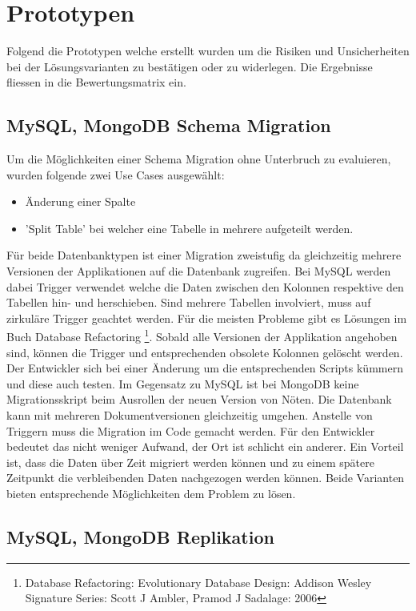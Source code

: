 \section{Prototypen}

Folgend die Prototypen welche erstellt wurden um die Risiken und Unsicherheiten bei der Lösungsvarianten zu bestätigen oder zu widerlegen. Die Ergebnisse fliessen in die Bewertungsmatrix ein.

\subsection{MySQL, MongoDB Schema Migration}

Um die Möglichkeiten einer Schema Migration ohne Unterbruch zu evaluieren, wurden folgende zwei Use Cases ausgewählt:
\begin{itemize}
	\item Änderung einer Spalte
	\item 'Split Table' bei welcher eine Tabelle in mehrere aufgeteilt werden.
\end{itemize}
Für beide Datenbanktypen ist einer Migration zweistufig da gleichzeitig mehrere Versionen der Applikationen auf die Datenbank zugreifen. Bei MySQL werden dabei Trigger verwendet welche die Daten zwischen den Kolonnen respektive den Tabellen hin- und herschieben. Sind mehrere Tabellen involviert, muss auf zirkuläre Trigger geachtet werden. Für die meisten Probleme gibt es Lösungen im Buch Database Refactoring \footnote{Database Refactoring: Evolutionary Database Design: Addison Wesley Signature Series: Scott J Ambler, Pramod J Sadalage: 2006}. Sobald alle Versionen der Applikation angehoben sind, können die Trigger und entsprechenden obsolete Kolonnen gelöscht werden. Der Entwickler sich bei einer Änderung um die entsprechenden Scripts kümmern und diese auch testen.\newline
Im Gegensatz zu MySQL ist bei MongoDB keine Migrationsskript beim Ausrollen der neuen Version von Nöten. Die Datenbank kann mit mehreren Dokumentversionen gleichzeitig umgehen. Anstelle von Triggern muss die Migration im Code gemacht werden. Für den Entwickler bedeutet das nicht weniger Aufwand, der Ort ist schlicht ein anderer. Ein Vorteil ist, dass die Daten über Zeit migriert werden können und zu einem spätere Zeitpunkt die verbleibenden Daten nachgezogen werden können.\newline
Beide Varianten bieten entsprechende Möglichkeiten dem Problem zu lösen.

\subsection{MySQL, MongoDB Replikation}


